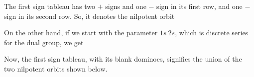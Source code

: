 \documentclass[12pt]{article}
\numberwithin{equation}{section}
\theoremstyle{definition}
\theoremstyle{remark}
\begin{document}
  The first sign tableau has two $+$ signs and one $-$ sign in its first row, and one $-$ sign in its second row.
  So, it denotes the nilpotent orbit
  \begin{figure}[H]
    \centering
  \end{figure}

  On the other hand, if we start with the parameter $1s\ 2s$, which is discrete series for the dual group, we get
  \begin{figure}[H]
    \centering
  \end{figure}
  Now, the first sign tableau, with its blank dominoes, signifies the union of the two nilpotent orbits shown below.
  \begin{figure}[H]
    \centering
  \end{figure}
\end{document}
